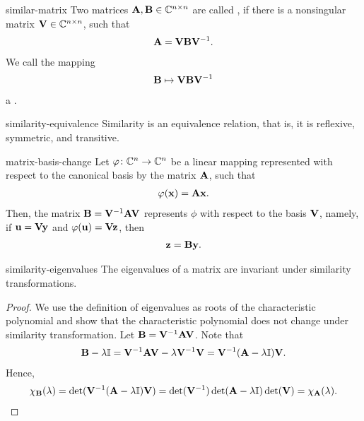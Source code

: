 \begin{Definition}{similar-matrix}
  Two matrices $\mathbf A,\mathbf B\in\mathbb C^{n\times n}$ are called , if there is a nonsingular matrix $\mathbf V\in\mathbb C^{n\times n}$, such that
  \begin{gather}
      \mathbf A = \mathbf V \mathbf B \mathbf V^{-1}.
  \end{gather}
  We call the mapping
  \begin{gather}
      \mathbf B \mapsto \mathbf V \mathbf B \mathbf V^{-1}
  \end{gather}
  a .
\end{Definition}

\begin{Lemma}{similarity-equivalence}
  Similarity is an equivalence relation, that is, it is reflexive,
  symmetric, and transitive.
\end{Lemma}

\begin{Lemma}{matrix-basis-change}
  Let $\varphi\colon \mathbb C^n\to \mathbb C^n$ be a linear mapping represented with
  respect to the canonical basis by the matrix $\mathbf A$, such that
  \begin{gather}
    \varphi(\mathbf x) = \mathbf A \mathbf x.
  \end{gather}
  Then, the matrix $\mathbf B = \mathbf V^{-1}\mathbf A\mathbf V$ represents $\phi$
  with respect to the basis $\mathbf V$, namely, if $\mathbf u = \mathbf V \mathbf y$ and
  $\varphi(\mathbf u) = \mathbf V \mathbf z$, then
  \begin{gather}
    \mathbf z = \mathbf B \mathbf y.
  \end{gather}
\end{Lemma}

\begin{Lemma}{similarity-eigenvalues}
  The eigenvalues of a matrix are invariant under similarity transformations.
\end{Lemma}

\begin{proof}
  We use the definition of eigenvalues as roots of the characteristic
  polynomial and show that the characteristic polynomial does not
  change under similarity transformation. Let
  $\mathbf B = \mathbf V^{-1}\mathbf A\mathbf V$. Note that
  \begin{gather}
    \mathbf B-\lambda\mathbb I = \mathbf V^{-1}\mathbf A\mathbf V - \lambda \mathbf V^{-1}\mathbf V
    = \mathbf V^{-1}(\mathbf A-\lambda\mathbb I)\mathbf V.
  \end{gather}
  Hence,
  \begin{gather}
    \chi_{\mathbf B}(\lambda) = \det(\mathbf V^{-1}{(\mathbf A-\lambda\mathbb I)}\mathbf V)
    = \det(\mathbf V^{-1})\det(\mathbf A-\lambda\mathbb I)\det(\mathbf V)
    = \chi_{\mathbf A}(\lambda).
  \end{gather}
\end{proof}

